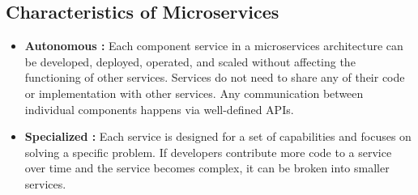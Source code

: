 \subsection{Characteristics of Microservices}
\begin{itemize}
    \item \textbf{Autonomous :} Each component service in a microservices architecture can be developed, deployed, operated, and scaled without affecting the functioning of other services. Services do not need to share any of their code or implementation with other services. Any communication between individual components happens via well-defined APIs.
    \item \textbf{Specialized :} Each service is designed for a set of capabilities and focuses on solving a specific problem. If developers contribute more code to a service over time and the service becomes complex, it can be broken into smaller services.
\end{itemize}

